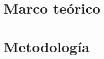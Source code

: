 \documentclass[letterpaper, 11pt]{report}
\begin{document}
  \chapter{Marco teórico}\label{chap:mteorico}
  

  \chapter{Metodología}\label{chap:metodologia}
  



  \nocite{*}
  \printbibliography[heading=bibintoc, title={Referencias}]

\newpage  

\newpage
    


  



\end{document}
